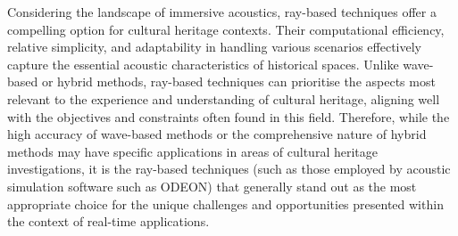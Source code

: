 Considering the landscape of immersive acoustics, ray-based techniques offer a compelling option for cultural heritage contexts. Their computational efficiency, relative simplicity, and adaptability in handling various scenarios effectively capture the essential acoustic characteristics of historical spaces. Unlike wave-based or hybrid methods, ray-based techniques can prioritise the aspects most relevant to the experience and understanding of cultural heritage, aligning well with the objectives and constraints often found in this field. Therefore, while the high accuracy of wave-based methods or the comprehensive nature of hybrid methods may have specific applications in areas of cultural heritage investigations, it is the ray-based techniques (such as those employed by acoustic simulation software such as ODEON) that generally stand out as the most appropriate choice for the unique challenges and opportunities presented within the context of real-time applications.

